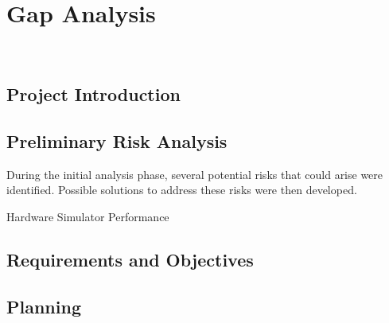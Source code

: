 \chapter{Gap Analysis}
\label{chap:gap-analysis}

\\

\section{Project Introduction}

\section{Preliminary Risk Analysis}

During the initial analysis phase, several potential risks that could arise were identified.  
Possible solutions to address these risks were then developed.\\

\begin{risk}{Hardware Simulator Performance}
    \label{risk:hardware-simulator} 
\end{risk}

\section{Requirements and Objectives}

\section{Planning}
